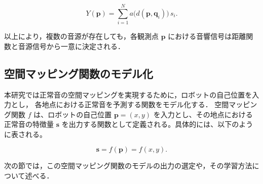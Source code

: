 \documentclass[../main]{subfiles}
\begin{document}
\begin{equation}
  Y(\mathbf{p}) = \sum_{i=1}^{N} a\bigl(d(\mathbf{p}, \mathbf{q}_i)\bigr) \, s_i.
\end{equation}


以上により，複数の音源が存在しても，各観測点 \(\mathbf{p}\) における音響信号は距離関数と音源信号から一意に決定される．


\subsection{空間マッピング関数のモデル化}
本研究では正常音の空間マッピングを実現するために，ロボットの自己位置を入力とし，
各地点における正常音を予測する関数をモデル化する．
空間マッピング関数 \( f \) は、ロボットの自己位置 \( \mathbf{p} = (x, y) \) を入力とし、その地点における正常音の特徴量 \( \mathbf{s} \) を出力する関数として定義される。具体的には、以下のように表される。

\begin{equation}
  \mathbf{s} = f(\mathbf{p}) = f(x, y).
\end{equation}

次の節では，この空間マッピング関数のモデルの出力の選定や，その学習方法について述べる．
\end{document}
